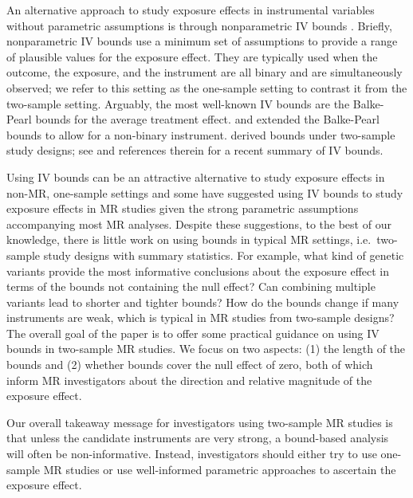 \documentclass[
]{article}
\theoremstyle{plain}
\begin{document}
An alternative approach to study exposure effects in instrumental variables without parametric assumptions is through nonparametric IV bounds \autocite{balke_bounds_1997,cheng_bounds_2006,manski_nonparametric_1990,richardson_ace_2014,robins_analysis_1989}. Briefly, nonparametric IV bounds use a minimum set of assumptions to provide a range of plausible values for the exposure effect. They are typically used when the outcome, the exposure, and the instrument are all binary and are simultaneously observed; we refer to this setting as the one-sample setting to contrast it from the two-sample setting. Arguably, the most well-known IV bounds are the Balke-Pearl bounds \autocite{balke_bounds_1997} for the average treatment effect. \textcite{cheng_bounds_2006} and \textcite{richardson_ace_2014} extended the Balke-Pearl bounds to allow for a non-binary instrument. \textcite{ramsahai_causal_2012} derived bounds under two-sample study designs; see \textcite{swanson_partial_2018} and references therein for a recent summary of IV bounds.

Using IV bounds can be an attractive alternative to study exposure effects in non-MR, one-sample settings \autocite{swanson_commentary_2013,swanson_partial_2018} and some \autocite{didelez_mendelian_2007,swanson_commentary_2017} have suggested using IV bounds to study exposure effects in MR studies given the strong parametric assumptions accompanying most MR analyses. Despite these suggestions, to the best of our knowledge, there is little work on using bounds in typical MR settings, i.e.~two-sample study designs with summary statistics. For example, what kind of genetic variants provide the most informative conclusions about the exposure effect in terms of the bounds not containing the null effect? Can combining multiple variants lead to shorter and tighter bounds? How do the bounds change if many instruments are weak, which is typical in MR studies from two-sample designs? The overall goal of the paper is to offer some practical guidance on using IV bounds in two-sample MR studies. We focus on two aspects: (1) the length of the bounds and (2) whether bounds cover the null effect of zero, both of which inform MR investigators about the direction and relative magnitude of the exposure effect.

Our overall takeaway message for investigators using two-sample MR studies is that unless the candidate instruments are very strong, a bound-based analysis will often be non-informative. Instead, investigators should either try to use one-sample MR studies or use well-informed parametric approaches to ascertain the exposure effect.
\end{document}
